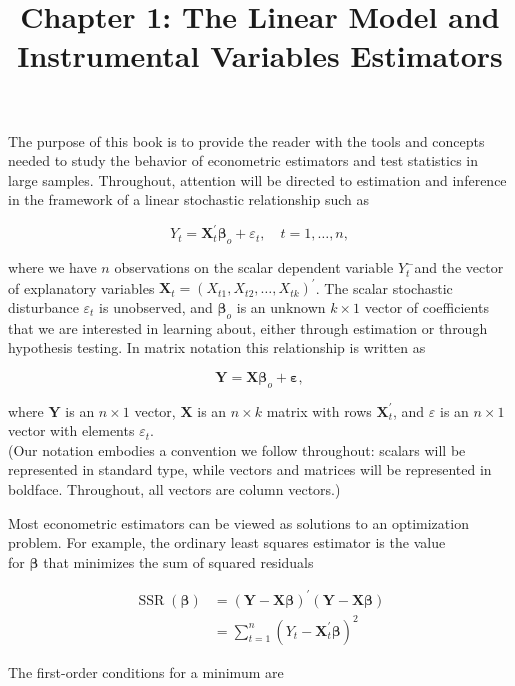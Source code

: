 \documentclass[10pt]{article}
\title{Chapter 1: The Linear Model and Instrumental Variables Estimators}
\author{}
\date{}
\begin{document}
\maketitle

The purpose of this book is to provide the reader with the tools and concepts needed to study the behavior of econometric estimators and test statistics in large samples. Throughout, attention will be directed to estimation and inference in the framework of a linear stochastic relationship such as

$$
Y_{t}=\mathbf{X}_{t}^{\prime} \boldsymbol{\beta}_{o}+\varepsilon_{t}, \quad t=1, \ldots, n,
$$

where we have $n$ observations on the scalar dependent variable $Y_{t}^{-}$and the vector of explanatory variables $\mathbf{X}_{t}=\left(X_{t 1}, X_{t 2}, \ldots, X_{t k}\right)^{\prime}$. The scalar stochastic disturbance $\varepsilon_{t}$ is unobserved, and $\boldsymbol{\beta}_{o}$ is an unknown $k \times 1$ vector of coefficients that we are interested in learning about, either through estimation or through hypothesis testing. In matrix notation this relationship is written as

$$
\mathbf{Y}=\mathbf{X} \boldsymbol{\beta}_{o}+\boldsymbol{\varepsilon},
$$

where $\mathbf{Y}$ is an $n \times 1$ vector, $\mathbf{X}$ is an $n \times k$ matrix with rows $\mathbf{X}_{t}^{\prime}$, and $\varepsilon$ is an $n \times 1$ vector with elements $\varepsilon_{t}$.\\
(Our notation embodies a convention we follow throughout: scalars will be represented in standard type, while vectors and matrices will be represented in boldface. Throughout, all vectors are column vectors.)

Most econometric estimators can be viewed as solutions to an optimization problem. For example, the ordinary least squares estimator is the value\\
for $\boldsymbol{\beta}$ that minimizes the sum of squared residuals

$$
\begin{aligned}
\operatorname{SSR}(\boldsymbol{\beta}) & =(\mathbf{Y}-\mathbf{X} \boldsymbol{\beta})^{\prime}(\mathbf{Y}-\mathbf{X} \boldsymbol{\beta}) \\
& =\sum_{t=1}^{n}\left(Y_{t}-\mathbf{X}_{t}^{\prime} \boldsymbol{\beta}\right)^{2}
\end{aligned}
$$

The first-order conditions for a minimum are
\end{document}
